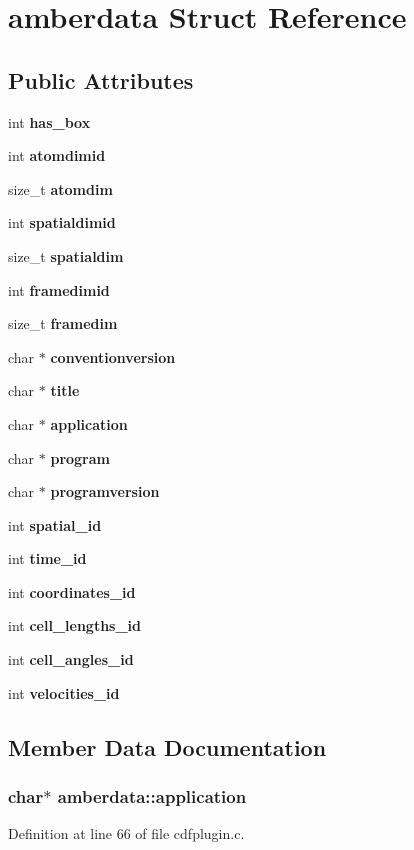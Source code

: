 \section{amberdata  Struct Reference}
\label{structamberdata}
\subsection*{Public Attributes}
\begin{CompactItemize}
\item 
int {\bf has\_\-box}
\item 
int {\bf atomdimid}
\item 
size\_\-t {\bf atomdim}
\item 
int {\bf spatialdimid}
\item 
size\_\-t {\bf spatialdim}
\item 
int {\bf framedimid}
\item 
size\_\-t {\bf framedim}
\item 
char $\ast$ {\bf conventionversion}
\item 
char $\ast$ {\bf title}
\item 
char $\ast$ {\bf application}
\item 
char $\ast$ {\bf program}
\item 
char $\ast$ {\bf programversion}
\item 
int {\bf spatial\_\-id}
\item 
int {\bf time\_\-id}
\item 
int {\bf coordinates\_\-id}
\item 
int {\bf cell\_\-lengths\_\-id}
\item 
int {\bf cell\_\-angles\_\-id}
\item 
int {\bf velocities\_\-id}
\end{CompactItemize}


\subsection{Member Data Documentation}
\subsubsection{\setlength{\rightskip}{0pt plus 5cm}char$\ast$ amberdata::application}\label{structamberdata_m9}




Definition at line 66 of file cdfplugin.c.


